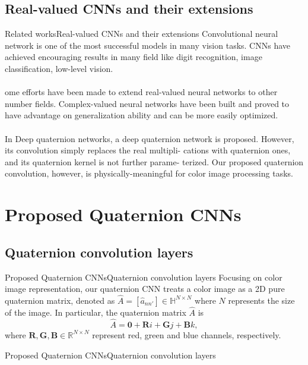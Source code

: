 \documentclass{beamer}
\begin{document}
\subsection{Real-valued CNNs and their extensions}
\begin{frame}{Related works}{Real-valued CNNs and their extensions}
Convolutional neural network is one of the most successful models in many vision tasks. CNNs have achieved encouraging results in many field like digit recognition, image classification, low-level vision.
\\~\\
ome efforts have been made to extend real-valued neural networks to other number fields. Complex-valued neural networks have been built and proved to have advantage on generalization ability and can be more easily optimized.
\\~\\
In Deep quaternion networks, a deep quaternion
network is proposed. However, its convolution simply replaces the real multipli-
cations with quaternion ones, and its quaternion kernel is not further parame-
terized. Our proposed quaternion convolution, however, is physically-meaningful
for color image processing tasks.

\end{frame}

\section{Proposed Quaternion CNNs}
\subsection{Quaternion convolution layers}
\begin{frame}{Proposed Quaternion CNNs}{Quaternion convolution layers}
Focusing on color image representation, our quaternion CNN treats a color image as a 2D pure quaternion matrix, denoted as $\hat{A}=[\hat{a}_{nn'}]\in \mathbb{H}^{N\times N}$ where $N$ represents the size of the image. In particular, the quaternion matrix $\hat{A}$ is 
$$\hat{A}=\mathbf{0}+\textbf{R}i+\textbf{G}j+\textbf{B}k,$$ where $\textbf{R},\textbf{G},\textbf{B}\in \mathbb{R}^{N\times N}$ represent red, green and blue channels, respectively.

\end{frame}

\begin{frame}{Proposed Quaternion CNNs}{Quaternion convolution layers}
    
    
\end{frame}
\end{document}
